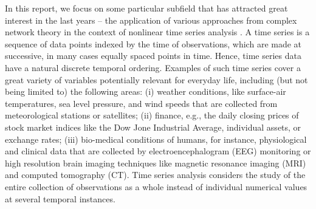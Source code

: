In this report, we focus on some particular subfield that has attracted great interest in the last years -- the application of various approaches from complex network theory in the context of nonlinear time series analysis \cite{kantz1997,abarbanel1993,Sprott2003}. A time series is a sequence of data points indexed by the time of observations, which are made at successive, in many cases equally spaced points in time. Hence, time series data have a natural discrete temporal ordering. Examples of such time series cover a great variety of variables potentially relevant for everyday life, including (but not being limited to) the following areas: (i) weather conditions, like surface-air temperatures, sea level pressure, and wind speeds that are collected from meteorological stations or satellites; (ii) finance, e.g., the daily closing prices of stock market indices like
the Dow Jone Industrial Average, individual assets, or exchange rates; (iii) bio-medical conditions of humans, for instance, physiological and clinical data that are collected by electroencephalogram (EEG) monitoring or high resolution brain imaging techniques like magnetic resonance imaging (MRI) and computed tomography (CT). Time series analysis considers the study of the entire collection of observations as a whole instead of individual numerical values at several temporal instances. 


